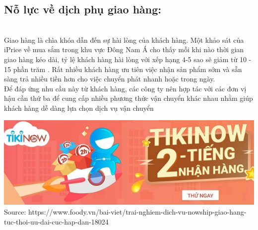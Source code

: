 \documentclass[13pt,a4paper]{article}
\begin{document}
    \subsection{Nỗ lực về dịch phụ giao hàng:}\\
    Giao hàng là chìa khóa dẫn đến sự hài lòng của khách hàng. Một khảo sát của iPrice về mua sắm trong khu vực Đông Nam Á cho thấy mỗi khi nào thời gian giao hàng kéo dài, tỷ lệ khách hàng hài lòng với xếp hạng 4-5 sao sẽ giảm từ 10 - 15 phần trăm . Rất nhiều khách hàng ưu tiên việc nhận sản phẩm sớm và sẵn sàng trả nhiều tiền hơn cho việc chuyển phát nhanh hoặc trong ngày.\\
    Để đáp ứng nhu cầu này từ khách hàng, các công ty nên hợp tác với các đơn vị hậu cần thứ ba để cung cấp nhiều phương thức vận chuyển khác nhau nhằm giúp khách hàng dễ dàng lựa chọn dịch vụ vận chuyển
    \begin{center}
    \includegraphics[scale=0.6]{images/giaohang.png} \\
    \fontsize{10pt}{1.2pt}\selectfont
    Source: https://www.foody.vn/bai-viet/trai-nghiem-dich-vu-nowship-giao-hang-tuc-thoi-uu-dai-cuc-hap-dan-18024
    \end{center}
\end{document}
